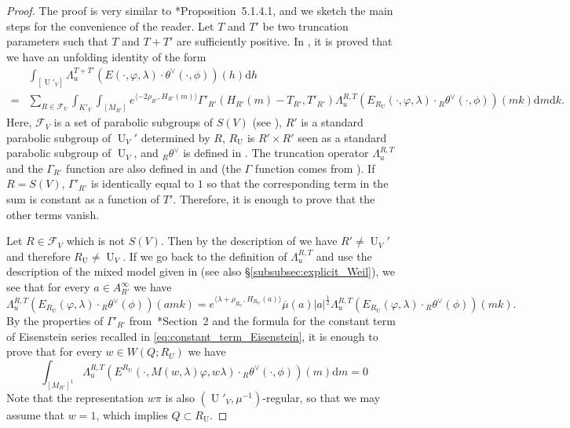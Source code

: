 \documentclass[letterpaper,11pt]{amsart}
\newcommand{\cF}{\mathcal{F}}
\newcommand{\rd}{\mathrm{d}}
\newcommand{\<}{\negthickspace}
\DeclareMathOperator{\U}{U}
\theoremstyle{definition}
\theoremstyle{plain}
\theoremstyle{remark}
\numberwithin{equation}{section}
\begin{document}
\begin{proof}
    The proof is very similar to \cite{BPCZ}*{Proposition~5.1.4.1}, and we sketch the main steps for the convenience of the reader. Let $T$ and $T'$ be two truncation parameters such that $T$ and $T+T'$ are sufficiently positive. In \cite[Equation~(7.16)]{BLX1}, it is proved that we have an unfolding identity of the form
    \begin{align*}
         &\int_{[\U'_V]}  \Lambda_u^{T+T'} \left( E(\cdot,\varphi,\lambda)
    \cdot \theta^\vee(\cdot,\phi) \right)(h) \rd h \\
    =&\sum_{R \in \cF_V}  \int_{K'_V}  \int_{[M_{R'}]}  e^{\langle -2\rho_{R'},H_{R'}(m)
    \rangle} \Gamma'_{R'}(H_{R'}(m)-T_{R'},T'_{R'})
    \Lambda^{R,T}_u \left( E_{R_{\U}}(\cdot,\varphi,\lambda)
    \cdot {}_R \theta^\vee(\cdot,\phi) \right)(mk) \rd m \rd k.
    \end{align*}
    Here, $\cF_V$ is a set of parabolic subgroups of $S(V)$ (see \cite[Section~4.3]{BLX1}), $R'$ is a standard parabolic subgroup of $\U_V'$ determined by $R$, $R_{\U}$ is $R' \times R'$ seen as a standard parabolic subgroup of $\U_V$, and ${}_R \theta^\vee$ is defined in \cite[Section~4.4]{BLX1}. The truncation operator $\Lambda^{R,T}_{u}$ and the $\Gamma_{R'}$ function are also defined in \cite[Section~7.5]{BLX1} and \cite[Proof of Theorem~7.6]{BLX1} (the $\Gamma$ function comes from \cite[Section~2]{Arthur1}). If $R=S(V)$, $\Gamma'_{R'}$ is identically equal to $1$ so that the corresponding term in the sum is constant as a function of $T'$. Therefore, it is enough to prove that the other terms vanish.

    Let $R \in \cF_V$ which is not $S(V)$. Then by the description of \cite[Section~4.3]{BLX1} we have $R' \neq \U_V'$ and therefore $R_{\U}\neq \U_V$. If we go back to the definition of $\Lambda^{R,T}_{u}$ and use the description of the mixed model given in \cite[Section~4.4]{BLX1} (see also \S\ref{subsubsec:explicit_Weil}), we see that for every $a \in A_{R'}^\infty$ we have
    \begin{equation*}
    \Lambda^{R,T}_u \left( E_{R_{\U}}(\varphi,\lambda) \cdot
    {}_R \theta^\vee(\phi)\right)(amk) = e^{\langle \lambda + \rho_{R_{\U}}, H_{R_{\U}}(a) \rangle} \overline{\mu}(a)|a|^{\frac{1}{2}}  \Lambda^{R,T}_u \left( E_{R_{\U}}(\varphi,\lambda) \cdot
    {}_R \theta^\vee(\phi)\right)(mk).
\end{equation*}
    By the properties of $\Gamma'_{R'}$ from~\cite{Arthur1}*{Section~2} and the formula for the constant term of Eisenstein series recalled in \eqref{eq:constant_term_Eisenstein}, it is enough to prove that for every $w \in W(Q;R_U)$ we have  
    \begin{equation} \label{eq:IY_left_to_show_vanishing}
    \int_{[M_{R'}]^1} \Lambda^{R,T}_u \left( E^{R_{\U}}(\cdot,M(w,\lambda)\varphi,w\lambda)
    \cdot {}_R\theta^\vee(\cdot,\phi) \right)(m) \rd m=0
    \end{equation}
     Note that the representation $w \pi$ is also $(\U'_V,\mu^{-1})$-regular, so that we may assume that $w=1$, which implies $Q \subset R_{\U}$.


\end{proof}
\end{document}
